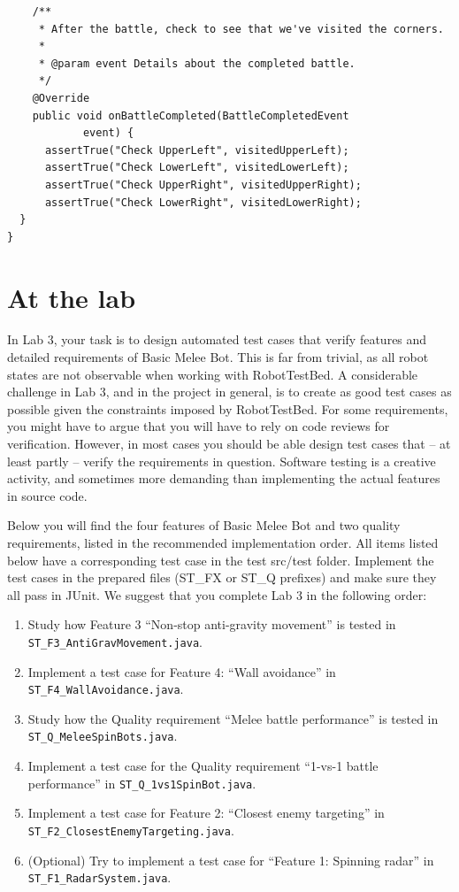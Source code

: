 \documentclass{scrreprt}
\begin{document}
\begin{verbatim}
	/**
	 * After the battle, check to see that we've visited the corners.
	 *
	 * @param event Details about the completed battle.
	 */
	@Override
	public void onBattleCompleted(BattleCompletedEvent
			event) {
      assertTrue("Check UpperLeft", visitedUpperLeft);
      assertTrue("Check LowerLeft", visitedLowerLeft);
      assertTrue("Check UpperRight", visitedUpperRight);
      assertTrue("Check LowerRight", visitedLowerRight);
  }
}
\end{verbatim}

\chapter{At the lab} \label{sec:atlab}
In Lab 3, your task is to design automated test cases that verify features and detailed requirements of Basic Melee Bot. This is far from trivial, as all robot states are not observable when working with RobotTestBed. A considerable challenge in Lab 3, and in the project in general, is to create as good test cases as possible given the constraints imposed by RobotTestBed. For some requirements, you might have  to argue that you will have to rely on code reviews for verification. However, in most cases you should be able design test cases that -- at least partly -- verify the requirements in question. Software testing is a creative activity, and sometimes more demanding than implementing the actual features in source code.

Below you will find the four features of Basic Melee Bot and two quality requirements, listed in the recommended implementation order. All items listed below have a corresponding test case in the test src/test folder. Implement the test cases in the prepared files (ST_FX or ST_Q prefixes) and make sure they all pass in JUnit. We suggest that you complete Lab 3 in the following order:

\begin{enumerate}
\item Study how Feature 3 ``Non-stop anti-gravity movement'' is tested in\\ \texttt{ST_F3_AntiGravMovement.java}.
\item Implement a test case for Feature 4: ``Wall avoidance'' in\\ \texttt{ST_F4_WallAvoidance.java}.
\item Study how the Quality requirement ``Melee battle performance'' is tested in\\ \texttt{ST_Q_MeleeSpinBots.java}.
\item Implement a test case for the Quality requirement ``1-vs-1 battle performance'' in \texttt{ST_Q_1vs1SpinBot.java}.
\item Implement a test case for Feature 2: ``Closest enemy targeting'' in\\ \texttt{ST_F2_ClosestEnemyTargeting.java}.
\item (Optional) Try to implement a test case for ``Feature 1: Spinning radar'' in\\ \texttt{ST_F1_RadarSystem.java}.
\end{enumerate}
\end{document}

